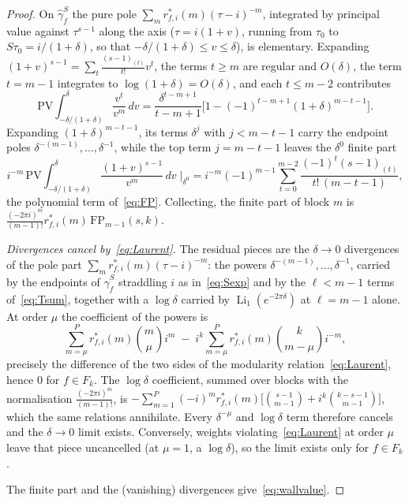 \documentclass[11pt]{article}
\DeclareMathOperator{\Li}{Li}
\begin{document}
\begin{proof}
On $\hat\gamma_f^S$ the pure pole $\sum_m r^*_{f,i}(m)(\tau-i)^{-m}$, integrated by principal value
against $\tau^{s-1}$ along the axis ($\tau=i(1+v)$, running from $\tau_0$ to $S\tau_0=i/(1+\delta)$,
so that $-\delta/(1+\delta)\le v\le\delta$), is elementary. Expanding
$(1+v)^{s-1}=\sum_{t}\tfrac{(s-1)_{(t)}}{t!}v^{t}$, the terms $t\ge m$ are regular and $O(\delta)$, the
term $t=m-1$ integrates to $\log(1+\delta)=O(\delta)$, and each $t\le m-2$ contributes
\begin{equation}\label{eq:Sexp}
\mathrm{PV}\!\int_{-\delta/(1+\delta)}^{\delta}\!\frac{v^{t}}{v^{m}}\,dv
=\frac{\delta^{t-m+1}}{t-m+1}\Big[1-(-1)^{t-m+1}(1+\delta)^{m-t-1}\Big].
\end{equation}
Expanding $(1+\delta)^{m-t-1}$, its terms $\delta^{j}$ with $j<m-t-1$ carry the endpoint poles
$\delta^{-(m-1)},\dots,\delta^{-1}$, while the top term $j=m-t-1$ leaves the $\delta^0$ finite part
\begin{equation}\label{eq:Spoly}
i^{-m}\,\mathrm{PV}\!\int_{-\delta/(1+\delta)}^{\delta}\frac{(1+v)^{s-1}}{v^{m}}\,dv\;\Big|_{\delta^0}
=i^{-m}(-1)^{m-1}\sum_{t=0}^{m-2}\frac{(-1)^{t}(s-1)_{(t)}}{t!\,(m-t-1)},
\end{equation}
the polynomial term of~\eqref{eq:FP}. Collecting, the finite part of block $m$ is
$\tfrac{(-2\pi i)^m}{(m-1)!}r^*_{f,i}(m)\,\mathrm{FP}_{m-1}(s,k)$.

\emph{Divergences cancel by~\eqref{eq:Laurent}.} The residual pieces are the $\delta\to0$ divergences
of the pole part $\sum_m r^*_{f,i}(m)(\tau-i)^{-m}$: the powers $\delta^{-(m-1)},\dots,\delta^{-1}$,
carried by the endpoints of $\hat\gamma_f^S$ straddling $i$ as in~\eqref{eq:Sexp} and by the
$\ell<m-1$ terms of~\eqref{eq:Tsum}, together with a $\log\delta$ carried by
$\Li_1(e^{-2\pi\delta})$ at $\ell=m-1$ alone. At order $\mu$ the coefficient of the powers is
\begin{equation}\label{eq:walldiv}
\sum_{m=\mu}^{P} r^*_{f,i}(m)\binom{m}{\mu}i^{m}\;-\;i^{k}\sum_{m=\mu}^{P} r^*_{f,i}(m)\binom{k}{m-\mu}i^{-m},
\end{equation}
precisely the difference of the two sides of the modularity relation~\eqref{eq:Laurent}, hence $0$ for
$f\in F_k$. The $\log\delta$ coefficient, summed over blocks with the normalisation
$\tfrac{(-2\pi i)^m}{(m-1)!}$, is
$-\sum_{m=1}^{P}(-i)^m r^*_{f,i}(m)\big[\binom{s-1}{m-1}+i^k\binom{k-s-1}{m-1}\big]$, which the same
relations annihilate. Every $\delta^{-\mu}$ and $\log\delta$ term therefore cancels and the $\delta\to0$ limit
exists. Conversely, weights violating~\eqref{eq:Laurent} at order $\mu$ leave that piece uncancelled (at $\mu=1$, a $\log\delta$), so the limit exists only for $f\in F_k$.%

The finite part and the (vanishing) divergences give~\eqref{eq:wallvalue}.
\end{proof}
\end{document}
